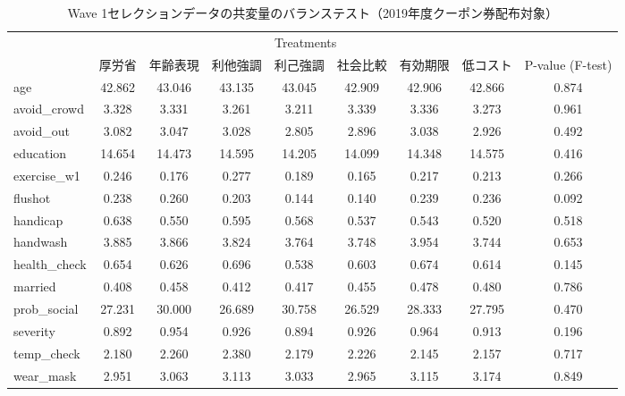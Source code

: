 \documentclass[
  11pt,
  a4paper,
]{article}
\begin{document}
\begin{table}

\caption{\label{tab:BalanceWave1Coupon1}Wave 1セレクションデータの共変量のバランステスト（2019年度クーポン券配布対象）}
\centering
\fontsize{9}{11}\selectfont
\begin{tabular}[t]{lcccccccc}
\toprule
\multicolumn{1}{c}{ } & \multicolumn{7}{c}{Treatments} & \multicolumn{1}{c}{ } \\
\cmidrule(l{3pt}r{3pt}){2-8}
  & 厚労省 & 年齢表現 & 利他強調 & 利己強調 & 社会比較 & 有効期限 & 低コスト & P-value (F-test)\\
\midrule
age & 42.862 & 43.046 & 43.135 & 43.045 & 42.909 & 42.906 & 42.866 & 0.874\\
avoid\_crowd & 3.328 & 3.331 & 3.261 & 3.211 & 3.339 & 3.336 & 3.273 & 0.961\\
avoid\_out & 3.082 & 3.047 & 3.028 & 2.805 & 2.896 & 3.038 & 2.926 & 0.492\\
education & 14.654 & 14.473 & 14.595 & 14.205 & 14.099 & 14.348 & 14.575 & 0.416\\
exercise\_w1 & 0.246 & 0.176 & 0.277 & 0.189 & 0.165 & 0.217 & 0.213 & 0.266\\
flushot & 0.238 & 0.260 & 0.203 & 0.144 & 0.140 & 0.239 & 0.236 & 0.092\\
handicap & 0.638 & 0.550 & 0.595 & 0.568 & 0.537 & 0.543 & 0.520 & 0.518\\
handwash & 3.885 & 3.866 & 3.824 & 3.764 & 3.748 & 3.954 & 3.744 & 0.653\\
health\_check & 0.654 & 0.626 & 0.696 & 0.538 & 0.603 & 0.674 & 0.614 & 0.145\\
married & 0.408 & 0.458 & 0.412 & 0.417 & 0.455 & 0.478 & 0.480 & 0.786\\
prob\_social & 27.231 & 30.000 & 26.689 & 30.758 & 26.529 & 28.333 & 27.795 & 0.470\\
severity & 0.892 & 0.954 & 0.926 & 0.894 & 0.926 & 0.964 & 0.913 & 0.196\\
temp\_check & 2.180 & 2.260 & 2.380 & 2.179 & 2.226 & 2.145 & 2.157 & 0.717\\
wear\_mask & 2.951 & 3.063 & 3.113 & 3.033 & 2.965 & 3.115 & 3.174 & 0.849\\
\bottomrule
\end{tabular}
\end{table}
\end{document}

